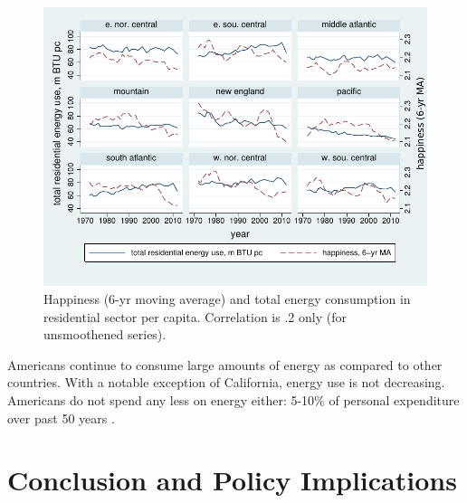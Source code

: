 \documentclass[10pt, letterpaper]{article}
\begin{document}
\begin{spacing}{1.0}
\begin{figure}[H]
 \includegraphics[width=5in]{graphsAndTables/cenDivLsYrSmINKSCAPE.pdf}\centering
\caption{Happiness (6-yr moving average) and total energy consumption
  in residential sector per capita. Correlation is .2 only (for unsmoothened series).
}\label{cenDivLsYrSm}
\end{figure}

Americans continue to consume large amounts of energy as compared to other
countries.  With a notable exception of California, energy use is
not decreasing. %
 Americans do not spend any less  on energy either: 5-10\% of personal
expenditure over past 50 years %
 \citep{bea-2-8-5}.


\section*{\large \bf Conclusion and Policy Implications} %


\end{spacing}
\end{document}
